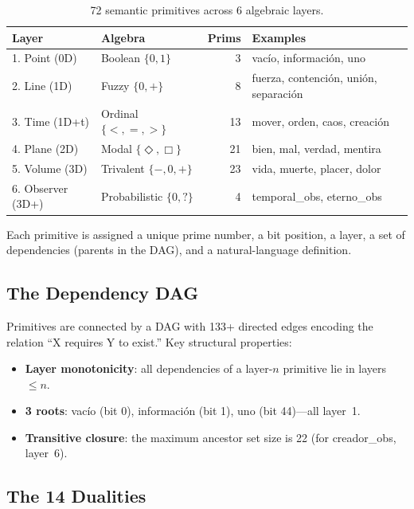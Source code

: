 \documentclass[11pt, a4paper]{article}
\begin{document}
\begin{table}[ht]
\centering
\small
\begin{tabular}{llrl}
\toprule
\textbf{Layer} & \textbf{Algebra} & \textbf{Prims} & \textbf{Examples} \\
\midrule
1. Point (0D)    & Boolean $\{0,1\}$     & 3  & vac\'{i}o, informaci\'{o}n, uno \\
2. Line (1D)     & Fuzzy $\{0,+\}$       & 8  & fuerza, contenci\'{o}n, uni\'{o}n, separaci\'{o}n \\
3. Time (1D+t)   & Ordinal $\{<,=,>\}$   & 13 & mover, orden, caos, creaci\'{o}n \\
4. Plane (2D)    & Modal $\{\Diamond,\Box\}$ & 21 & bien, mal, verdad, mentira \\
5. Volume (3D)   & Trivalent $\{-,0,+\}$ & 23 & vida, muerte, placer, dolor \\
6. Observer (3D+) & Probabilistic $\{0,?\}$ & 4 & temporal\_obs, eterno\_obs \\
\bottomrule
\end{tabular}
\caption{72 semantic primitives across 6 algebraic layers.}
\label{tab:primitives}
\end{table}

Each primitive is assigned a unique prime number, a bit position, a layer, a set of dependencies (parents in the DAG), and a natural-language definition.

\subsection{The Dependency DAG}

Primitives are connected by a DAG with 133+ directed edges encoding the relation ``X requires Y to exist.'' Key structural properties:

\begin{itemize}[nosep, leftmargin=*]
    \item \textbf{Layer monotonicity}: all dependencies of a layer-$n$ primitive lie in layers $\leq n$.
    \item \textbf{3 roots}: vac\'{i}o (bit 0), informaci\'{o}n (bit 1), uno (bit 44)---all layer~1.
    \item \textbf{Transitive closure}: the maximum ancestor set size is 22 (for creador\_obs, layer~6).
\end{itemize}

\subsection{The 14 Dualities}
\end{document}
